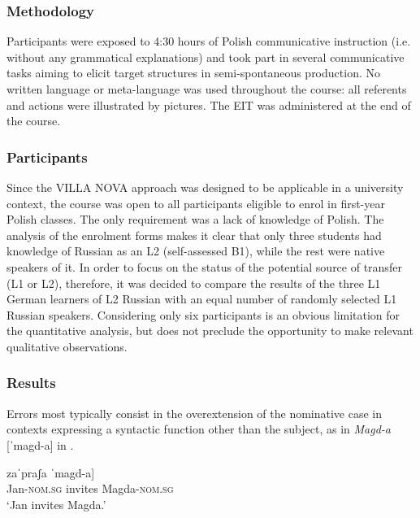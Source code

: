 \documentclass[output=paper,            colorlinks, citecolor=brown            		  ]{langscibook}
\begin{document}
\subsubsection{Methodology}\label{sec:saturno:3.3.1}

Participants were exposed to 4:30 hours of Polish communicative instruction (i.e. without any grammatical explanations) and took part in several communicative tasks aiming to elicit target structures in semi-spontaneous production. No written language or meta-language was used throughout the course: all referents and actions were illustrated by pictures. The EIT was administered at the end of the course. 

\subsubsection{Participants}\label{sec:saturno:3.3.2}

Since the VILLA NOVA approach was designed to be applicable in a university context, the course was open to all participants eligible to enrol in first-year Polish classes. The only requirement was a lack of knowledge of Polish. The analysis of the enrolment forms makes it clear that only three students had knowledge of Russian as an L2 (self-assessed B1), while the rest were native speakers of it. In order to focus on the status of the potential source of transfer (L1 or L2), therefore, it was decided to compare the results of the three L1 German learners of L2 Russian with an equal number of randomly selected L1 Russian speakers. Considering only six participants is an obvious limitation for the quantitative analysis, but does not preclude the opportunity to make relevant qualitative observations.

\subsubsection{Results}\label{sec:saturno:3.3.3}

Errors most typically consist in the overextension of the nominative case in contexts expressing a syntactic function other than the subject, as in \textit{Magd-a} [ˈmagd-a] in .

\ea\label{ex:saturno:23}  
\gll {[Jan-${\emptyset}$}   zaˈpraʃa  {ˈmagd-a]}\\
  Jan-\textsc{nom.sg}  invites    Magda-\textsc{nom.sg}\\ 
 \glt ‘Jan invites Magda.’
\z
\end{document}
